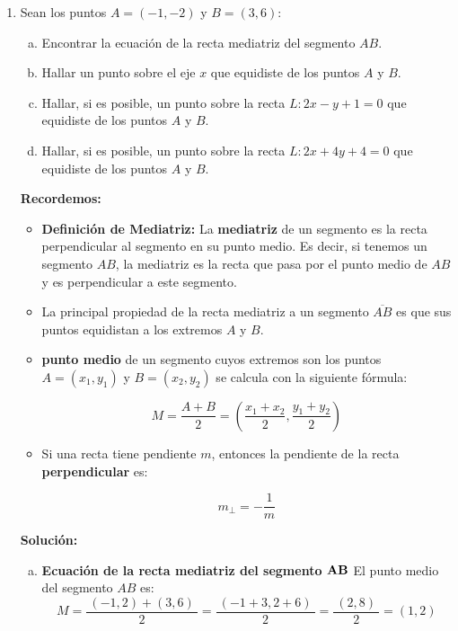 \documentclass[11pt]{article}
\begin{document}
\begin{enumerate}[\hspace{-5mm} 1) ]
\item Sean los puntos $A = (-1,-2)$ y $B = (3,6)$:

\begin{enumerate}[(a)]
    \item Encontrar la ecuación de la recta mediatriz del segmento $AB$.
    \item  Hallar un punto sobre el eje $x$ que equidiste de los puntos $A$ y $B$.
    \item  Hallar, si es posible, un punto sobre la recta $L : 2x - y + 1 = 0$ que equidiste de los puntos $A$ y $B$.
    \item Hallar, si es posible, un punto sobre la recta $L : 2x + 4y + 4 = 0$ que equidiste de los puntos $A$ y $B$.
\end{enumerate}



{\bf Recordemos:}

\begin{itemize}
    \item {\bf Definición de Mediatriz:}  La {\bf mediatriz} de un segmento es la recta perpendicular al segmento en su punto medio. Es decir, si tenemos un segmento $ AB $, la mediatriz es la recta que pasa por el punto medio de $ AB $ y es perpendicular a este segmento.


\item La principal propiedad de la recta mediatriz a un segmento $\overline{AB}$ es que sus puntos equidistan a los extremos $A$ y $B$.


\item {\bf punto medio} de un segmento cuyos extremos son los puntos $ A=(x_1, y_1) $ y $ B=(x_2, y_2) $ se calcula con la siguiente fórmula:

\[
M= \dfrac{A+B}{2} = \left( \frac{x_1 + x_2}{2}, \frac{y_1 + y_2}{2} \right)
\]

\item Si una recta tiene pendiente $ m $, entonces la pendiente de la recta {\bf perpendicular} es:

\[
m_{\perp} = -\frac{1}{m}
\]
 
\end{itemize}



{\bf Solución:}

\begin{enumerate}[(a)]
    \item {\bf Ecuación de la recta mediatriz del segmento $\bf AB$}
El punto medio del segmento $AB$ es:
\begin{equation*}
    M= \dfrac{\ (-1,2) +(3,6)\ }{2} = \dfrac{\ (-1+3,2+6) \ }{2} = \dfrac{\ (2,8) \ }{2}   = (1,2)
\end{equation*}


\end{enumerate}
\end{enumerate}
\end{document}
